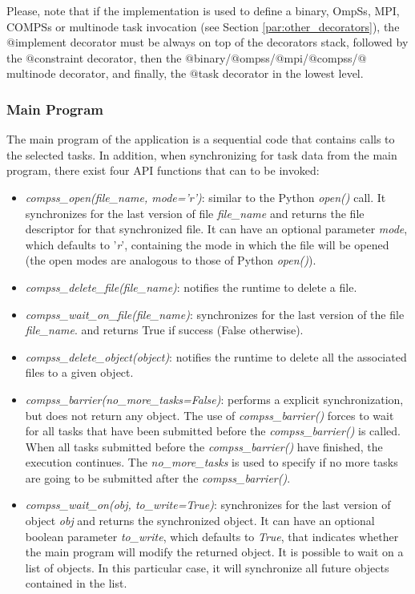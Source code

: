 Please, note that if the implementation is used to define a binary, OmpSs, MPI, COMPSs or multinode task invocation
(see Section \ref{par:other_decorators}), the $@$implement decorator must be always on top of the decorators stack,
followed by the $@$constraint decorator, then the $@$binary/$@$ompss/$@$mpi/$@$compss/$@$multinode decorator, and finally, 
the $@$task decorator in the lowest level.

\subsubsection{Main Program}
The main program of the application is a sequential code that contains calls to the selected tasks. 
In addition, when synchronizing for task data from the main program, 
there exist four API functions that can to be invoked:

\begin{itemize}
 \item {\it compss\_open(file\_name, mode='r')}: similar to the Python {\it open()} call. It synchronizes
       for the last version of file {\it file\_name} and returns the file descriptor for that synchronized
       file. It can have an optional parameter {\it mode}, which defaults to '{\it r}', containing the
       mode in which the file will be opened (the open modes are analogous to those of
       Python {\it open()}).
 \item {\it compss\_delete\_file(file\_name)}: notifies the runtime to delete a file.
 \item {\it compss\_wait\_on\_file(file\_name)}: synchronizes for the last version of the file {\it file\_name}.
       and returns True if success (False otherwise).
 \item {\it compss\_delete\_object(object)}: notifies the runtime to delete all the associated files to
       a given object.
 \item {\it compss\_barrier(no\_more\_tasks=False)}: performs a explicit synchronization, but does not return any object.
       The use of {\it compss\_barrier()} forces to wait for all tasks that have been submitted before the {\it compss\_barrier()} is called.
       When all tasks submitted before the {\it compss\_barrier()} have finished, the execution continues.
       The {\it no\_more\_tasks} is used to specify if no more tasks are going to be submitted after the {\it compss\_barrier()}.
 \item {\it compss\_wait\_on(obj, to\_write=True)}: synchronizes for the last version of object {\it obj}
       and returns the synchronized object. It can have an optional boolean parameter
       {\it to\_write}, which defaults to {\it True}, that indicates whether the main program will modify the
       returned object.       
       It is possible to wait on a list of objects. In this particular case, it will synchronize all future objects 
       contained in the list.
\end{itemize}

